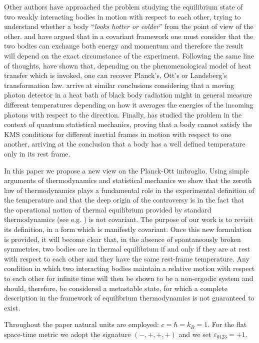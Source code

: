 \documentclass[twocolumn,usenatbib]{mnras2}
\begin{document}
Other authors have approached the problem studying the equilibrium state of two weakly interacting bodies in motion with respect to each other, trying to understand whether a body ``\textit{looks hotter or colder}'' from the point of view of the other. \cite{vanKampen1968} and \cite{Israel_1981_review} have argued that in a covariant framework one must consider that the two bodies can exchange both energy and momentum and therefore the result will depend on the exact circumstance of the experiment. Following the same line of thoughts, \cite{Biro2010} have shown that, depending on the phenomenological model of heat transfer which is invoked, one can recover Planck's, Ott's or Landsberg's transformation law. \cite{Landsberg_1996,Landsberg2004} arrive at similar conclusions considering that a moving photon detector in a heat bath of black body radiation might in general measure different temperatures depending on how it averages the energies of the incoming photons with respect to the direction. Finally, \cite{Sewell2008} has studied the problem in the context of quantum statistical mechanics, proving that a body cannot satisfy the KMS conditions for different inertial frames in motion with respect to one another, arriving at the conclusion that a body has a well defined temperature only in its rest frame. 

In this paper we propose a new view on the Planck-Ott imbroglio. Using simple arguments of thermodynamics and statistical mechanics we show that the zeroth law of thermodynamics plays a fundamental role in the experimental definition of the temperature and that the deep origin of the controversy is in the fact that the operational notion of thermal equilibrium provided by standard thermodynamics (see e.g. \citealt{Guggenheim1986}) is not covariant. The purpose of our work is to revisit its definition, in a form which is manifestly covariant. Once this new formulation is provided, it will become clear that, in the absence of spontaneously broken symmetries, two bodies are in thermal equilibrium if and only if they are at rest with respect to each other and they have the same rest-frame temperature. Any condition in which two interacting bodies maintain a relative motion with respect to each other for infinite time will then be shown to be a non-ergodic system and should, therefore, be considered a metastable state, for which a complete description in the framework of equilibrium thermodynamics is not guaranteed to exist.

Throughout the paper natural units are employed: $c=\hbar=k_B=1$. For the flat space-time metric we adopt the signature $(-,+,+,+)$ and we set $\varepsilon_{0123}=+1$.
\end{document}
